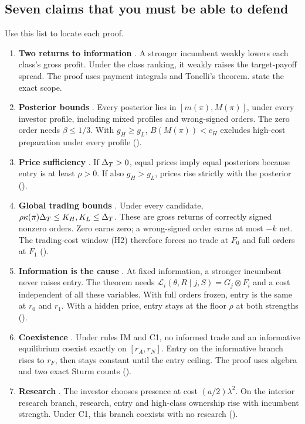 \subsection{Seven claims that you must be able to defend}\label{sec:01_brief-claims}

Use this list to locate each proof.
\begin{enumerate}
\item \textbf{Two returns to information} .
A stronger incumbent weakly lowers each class's gross profit.
Under the class ranking, it weakly raises the target-payoff spread.
The proof uses payment integrals and Tonelli's theorem.
 state the exact scope.
\item \textbf{Posterior bounds} .
Every posterior lies in \([m(\pi),M(\pi)]\), under every investor profile, including mixed profiles and wrong-signed orders.
The zero order needs \(\beta\le1/3\).
With \(g_H\ge g_L\), \(B(M(\pi))<c_H\) excludes high-cost preparation under every profile
().
\item \textbf{Price sufficiency} .
If \(\Delta_T>0\), equal prices imply equal posteriors because entry is at least \(\rho>0\).
If also \(g_H>g_L\), prices rise strictly with the posterior
().
\item \textbf{Global trading bounds} .
Under every candidate, \(\rho\kappa(\pi)\Delta_T\le K_H,K_L\le\Delta_T\).
These are gross returns of correctly signed nonzero orders.
Zero earns zero; a wrong-signed order earns at most \(-k\) net.
The trading-cost window (H2) therefore forces no trade at \(F_0\) and full orders at \(F_1\)
().
\item \textbf{Information is the cause} .
At fixed information, a stronger incumbent never raises entry.
The theorem needs \(\mathcal L_i(\theta,R\mid j,S)=G_j\otimes F_i\) and a cost independent of all these variables.
With full orders frozen, entry is the same at \(r_0\) and \(r_1\).
With a hidden price, entry stays at the floor \(\rho\) at both strengths
().
\item \textbf{Coexistence} .
Under rules IM and C1, no informed trade and an informative equilibrium coexist exactly on \([r_A,r_N]\).
Entry on the informative branch rises to \(r_F\), then stays constant until the entry ceiling.
The proof uses algebra and two exact Sturm counts
().
\item \textbf{Research} .
The investor chooses presence at cost \((a/2)\lambda^2\).
On the interior research branch, research, entry and high-class ownership rise with incumbent strength.
Under C1, this branch coexists with no research
().
\end{enumerate}

